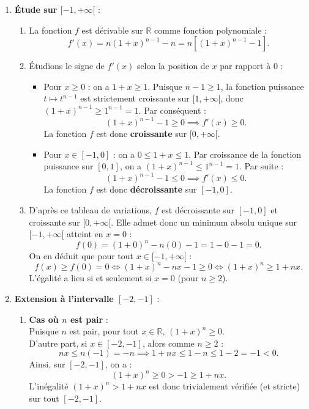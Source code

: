 \documentclass[11pt,a4paper]{article}
\newcommand{\R}{\mathbb{R}}
\begin{document}
\begin{correctionbox}
\begin{enumerate}[label=\textbf{\arabic*.}]
    \item \textbf{Étude sur $[-1, +\infty[$} :
    \begin{enumerate}[label=\alph*.]
        \item La fonction $f$ est dérivable sur $\R$ comme fonction polynomiale :
        \[
        f'(x) = n(1+x)^{n-1} - n = n \left[ (1+x)^{n-1} - 1 \right].
        \]

        \item Étudions le signe de $f'(x)$ selon la position de $x$ par rapport à $0$ :
        \begin{itemize}
            \item Pour $x \ge 0$ : on a $1+x \ge 1$. Puisque $n-1 \ge 1$, la fonction puissance $t \mapsto t^{n-1}$ est strictement croissante sur $[1, +\infty[$, donc $(1+x)^{n-1} \ge 1^{n-1} = 1$. Par conséquent :
            \[
            (1+x)^{n-1} - 1 \ge 0 \implies f'(x) \ge 0.
            \]
            La fonction $f$ est donc \textbf{croissante} sur $[0, +\infty[$.
            \item Pour $x \in [-1, 0]$ : on a $0 \le 1+x \le 1$. Par croissance de la fonction puissance sur $[0, 1]$, on a $(1+x)^{n-1} \le 1^{n-1} = 1$. Par suite :
            \[
            (1+x)^{n-1} - 1 \le 0 \implies f'(x) \le 0.
            \]
            La fonction $f$ est donc \textbf{décroissante} sur $[-1, 0]$.
        \end{itemize}

        \item D'après ce tableau de variations, $f$ est décroissante sur $[-1, 0]$ et croissante sur $[0, +\infty[$. Elle admet donc un minimum absolu unique sur $[-1, +\infty[$ atteint en $x = 0$ :
        \[
        f(0) = (1+0)^n - n(0) - 1 = 1 - 0 - 1 = 0.
        \]
        On en déduit que pour tout $x \in [-1, +\infty[$ :
        \[
        f(x) \ge f(0) = 0 \iff (1+x)^n - nx - 1 \ge 0 \iff (1+x)^n \ge 1+nx.
        \]
        L'égalité a lieu si et seulement si $x = 0$ (pour $n \ge 2$).
    \end{enumerate}

    \item \textbf{Extension à l'intervalle $[-2, -1]$} :
    \begin{enumerate}[label=\alph*.]
        \item \textbf{Cas où $n$ est pair} :\\
        Puisque $n$ est pair, pour tout $x \in \R$, $(1+x)^n \ge 0$.\\
        D'autre part, si $x \in [-2, -1]$, alors comme $n \ge 2$ :
        \[
        nx \le n(-1) = -n \implies 1 + nx \le 1 - n \le 1 - 2 = -1 < 0.
        \]
        Ainsi, sur $[-2, -1]$, on a :
        \[
        (1+x)^n \ge 0 > -1 \ge 1 + nx.
        \]
        L'inégalité $(1+x)^n > 1+nx$ est donc trivialement vérifiée (et stricte) sur tout $[-2, -1]$.


\end{enumerate}
\end{enumerate}
\end{correctionbox}
\end{document}

